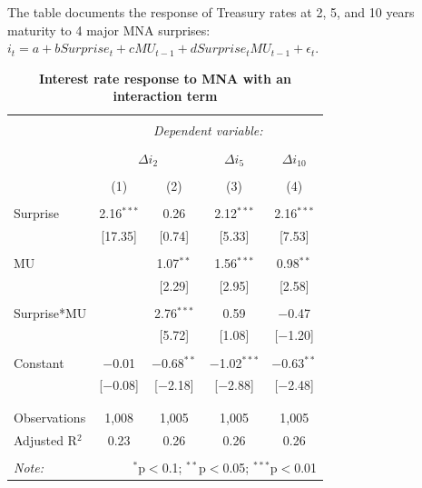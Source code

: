 \documentclass[12pt]{article}
\begin{document}
\begin{table}[!htbp] \centering 
  \caption{\textbf{Interest rate response to MNA with an interaction term}} 
  \label{}
    \begin{flushleft}
    {\medskip\small
 The table documents the response of Treasury rates at 2, 5, and 10 years maturity to 4 major MNA surprises: $i_t = a + b Surprise_t + c MU_{t-1} + d Surprise_t MU_{t-1} + \epsilon_t.$ }
    \medskip
    \end{flushleft}
\begin{tabular}{@{\extracolsep{5pt}}lcccc} 
\\[-1.8ex]\hline 
\hline \\[-1.8ex] 
 & \multicolumn{4}{c}{\textit{Dependent variable:}} \\ 
\cline{2-5} 
\\[-1.8ex] & \multicolumn{2}{c}{$\Delta i_2$} & $\Delta i_5$ & $\Delta i_{10}$ \\ 
\\[-1.8ex] & (1) & (2) & (3) & (4)\\ 
\hline \\[-1.8ex] 
 Surprise & 2.16$^{***}$ & 0.26 & 2.12$^{***}$ & 2.16$^{***}$ \\ 
  & [17.35] & [0.74] & [5.33] & [7.53] \\ 
  & & & & \\ 
 MU &  & 1.07$^{**}$ & 1.56$^{***}$ & 0.98$^{**}$ \\ 
  &  & [2.29] & [2.95] & [2.58] \\ 
  & & & & \\ 
 Surprise*MU &  & 2.76$^{***}$ & 0.59 & $-$0.47 \\ 
  &  & [5.72] & [1.08] & [$-$1.20] \\ 
  & & & & \\ 
 Constant & $-$0.01 & $-$0.68$^{**}$ & $-$1.02$^{***}$ & $-$0.63$^{**}$ \\ 
  & [$-$0.08] & [$-$2.18] & [$-$2.88] & [$-$2.48] \\ 
  & & & & \\ 
\hline \\[-1.8ex] 
Observations & 1,008 & 1,005 & 1,005 & 1,005 \\ 
Adjusted R$^{2}$ & 0.23 & 0.26 & 0.26 & 0.26 \\ 
\hline 
\hline \\[-1.8ex] 
\textit{Note:}  & \multicolumn{4}{r}{$^{*}$p$<$0.1; $^{**}$p$<$0.05; $^{***}$p$<$0.01} \\ 
\end{tabular} 
\end{table}
\end{document}
